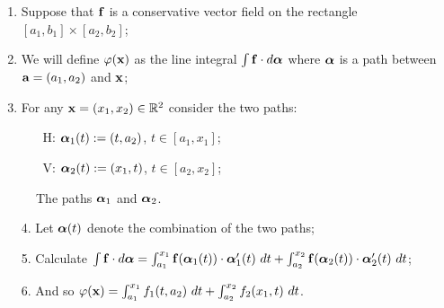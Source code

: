 \begin{enumerate}
    \item Suppose that \(\ff\) is a conservative vector field on the rectangle \([a_1,b_1]\times [a_2,b_2]\);
    \item We will define \(\varphi(\xx)\) as the line integral \(\int \ff \cdot d\aalpha\) where \(\aalpha\) is a path between \(\aa=(a_1,a_2)\) and \(\xx\);
    \item For any \(\xx = (x_1,x_2) \in \bR^2\) consider the two paths:
          \begin{itemize}
              \item[H:] \(\aalpha_1(t) := (t,a_2)\), \(t\in [a_1,x_1]\);
              \item[V:]  \(\aalpha_2(t) := (x_1,t)\),  \(t\in [a_2,x_2]\);
          \end{itemize}
\end{enumerate}




\begin{figure}
    \caption{The paths \(\aalpha_1\) and \(\aalpha_2\).}
\end{figure}





\begin{enumerate}
    \item[4.] Let \(\aalpha(t)\) denote the combination of the two paths;
    \item[5.] Calculate \(\int \ff \cdot d\aalpha = \int_{a_1}^{x_1} \ff(\aalpha_1(t))\cdot \aalpha_1'(t) \ dt +  \int_{a_2}^{x_2} \ff(\aalpha_2(t))\cdot \aalpha_2'(t) \ dt \);
    \item[6.] And so \(\varphi(\xx)  = \int_{a_1}^{x_1} f_1(t,a_2)\ dt + \int_{a_2}^{x_2} f_2(x_1,t)\ dt \).
\end{enumerate}




